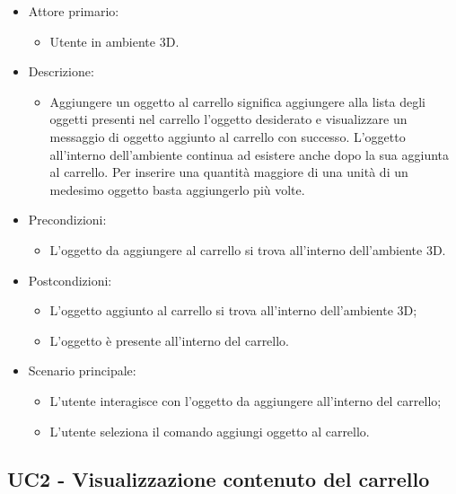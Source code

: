 \begin{itemize}

	\item Attore primario: 
	\begin{itemize}
		\item Utente in ambiente 3D.
	\end{itemize}
	\item Descrizione:
	\begin{itemize}
		\item Aggiungere un oggetto al carrello significa aggiungere alla lista degli oggetti presenti nel carrello l'oggetto desiderato e visualizzare un messaggio di oggetto aggiunto al carrello con successo.
\newline L'oggetto all'interno dell'ambiente continua ad esistere anche dopo la sua aggiunta al carrello.
\newline Per inserire una quantità maggiore di una unità di un medesimo oggetto basta aggiungerlo più volte.
	\end{itemize}
	
	\item Precondizioni:
	\begin{itemize}
		\item L'oggetto da aggiungere al carrello si trova all'interno dell'ambiente 3D.
	\end{itemize}
	
	\item Postcondizioni:
	\begin{itemize}
		\item L'oggetto aggiunto al carrello si trova all'interno dell'ambiente 3D;
		\item L'oggetto è presente all'interno del carrello.
	\end{itemize}
	
	\item Scenario principale:
	\begin{itemize}
		\item L'utente interagisce con l'oggetto da aggiungere all'interno del carrello;
		\item L'utente seleziona il comando aggiungi oggetto al carrello.
	\end{itemize}
	
\end{itemize}

\pagebreak

\subsection{UC2 - Visualizzazione contenuto del carrello}

